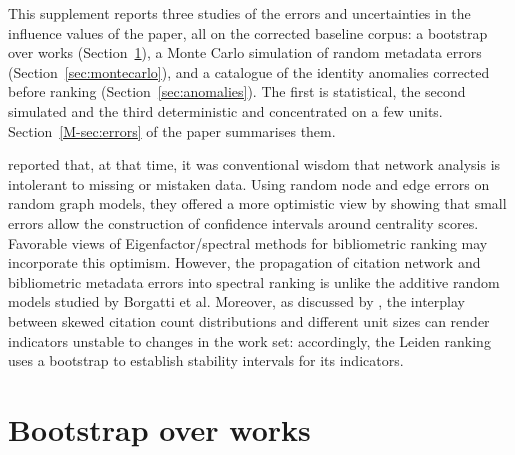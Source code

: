 
This supplement reports three studies of the errors and uncertainties in the influence values of the paper, all on the corrected baseline corpus: a bootstrap over works (Section~\ref{sec:bootstrap}), a Monte Carlo simulation of random metadata errors (Section~\ref{sec:montecarlo}), and a catalogue of the identity anomalies corrected before ranking (Section~\ref{sec:anomalies}). The first is statistical, the second simulated and the third deterministic and concentrated on a few units. Section~\ref{M-sec:errors} of the paper summarises them.

\textcite{borgattiRobustnessCentralityMeasures2006} reported that, at that time, it was conventional wisdom that network analysis is intolerant to missing or mistaken data. Using random node and edge errors on random graph models, they offered a more optimistic view by showing that small errors allow the construction of confidence intervals around centrality scores. Favorable views of Eigenfactor/spectral methods for bibliometric ranking \citep[e.g.][]{franceschetTenGoodReasons2010} may incorporate this optimism. However, the propagation of citation network and bibliometric metadata errors into spectral ranking is unlike the additive random models studied by Borgatti et al. Moreover, as discussed by \textcite{waltmanLeidenRanking20112012}, the interplay between skewed citation count distributions and different unit sizes can render indicators unstable to changes in the work set: accordingly, the Leiden ranking uses a bootstrap to establish stability intervals for its indicators. 

\section{Bootstrap over works}
\label{sec:bootstrap}

